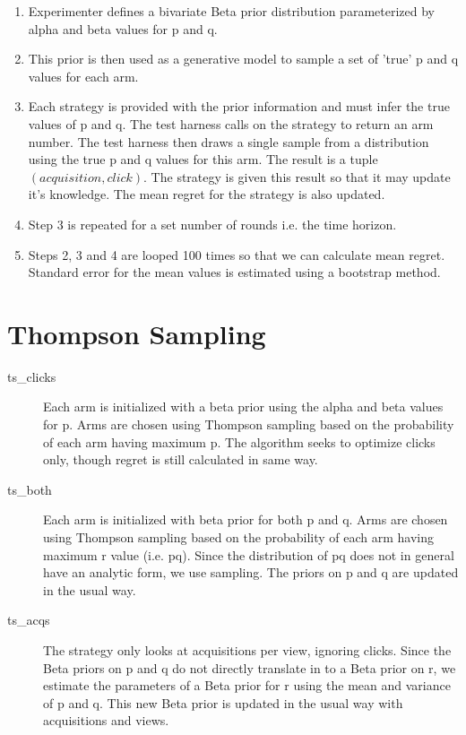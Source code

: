 \documentclass[11pt,a4,singlespacing,titlepagenumber=on]{scrreprt}
\numberwithin{equation}{chapter} %
\theoremstyle{remark}
\begin{document}
\begin{enumerate}
	\item Experimenter defines a bivariate Beta prior distribution parameterized by alpha and beta values for p and q.
	\item This prior is then used as a generative model to sample a set of 'true' p and q values for each arm.
	\item Each strategy is provided with the prior information and must infer the true values of p and q. The test harness calls on the strategy to return an arm number. The test harness then draws a single sample from a distribution using the true p and q values for this arm. The result is a tuple $(acquisition,click)$. The strategy is given this result so that it may update it's knowledge. The mean regret for the strategy is also updated.
	\item Step 3 is repeated for a set number of rounds i.e. the time horizon.
	\item Steps 2, 3 and 4 are looped 100 times so that we can calculate mean regret. Standard error for the mean values is estimated using a bootstrap method.
\end{enumerate}





\section{Thompson Sampling}

\begin{description}
	\item[ts\_clicks] Each arm is initialized with a beta prior using the alpha and beta values for p. Arms are chosen using Thompson sampling based on the probability of each arm having maximum p. The algorithm seeks to optimize clicks only, though regret is still calculated in same way.
	\item[ts\_both] Each arm is initialized with beta prior for both p and q. Arms are chosen using Thompson sampling based on the probability of each arm having maximum r value (i.e. pq). Since the distribution of pq does not in general have an analytic form, we use sampling. The priors on p and q are updated in the usual way.
	\item[ts\_acqs] The strategy only looks at acquisitions per view, ignoring clicks. Since the Beta priors on p and q do not directly translate in to a Beta prior on r, we estimate the parameters of a Beta prior for r using the mean and variance of p and q. This new Beta prior is updated in the usual way with acquisitions and views.
\end{description}
\end{document}
